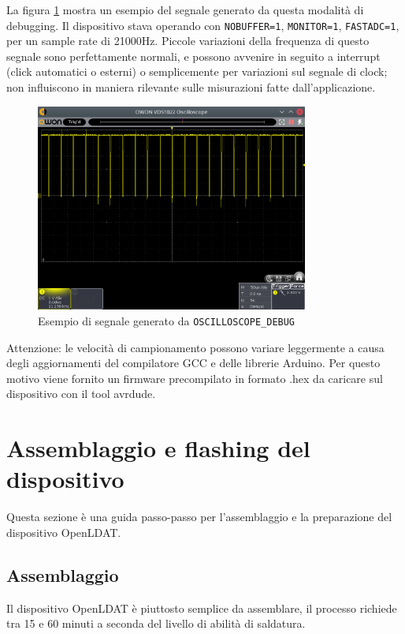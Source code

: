 La figura \ref{fig:oscilloscopedebug} mostra un esempio del segnale generato da questa modalità di debugging. Il dispositivo stava operando con \texttt{NOBUFFER=1}, \texttt{MONITOR=1}, \texttt{FASTADC=1}, per un sample rate di 21000Hz. Piccole variazioni della frequenza di questo segnale sono perfettamente normali, e possono avvenire in seguito a interrupt (click automatici o esterni) o semplicemente per variazioni sul segnale di clock; non influiscono in maniera rilevante sulle misurazioni fatte dall'applicazione.

\begin{figure}[h]
	\centering
	\includegraphics[width=0.8\textwidth]{Dispositivo_files/scope.png}
	\caption{Esempio di segnale generato da \texttt{OSCILLOSCOPE\_DEBUG}}
	\label{fig:oscilloscopedebug}
\end{figure}

Attenzione: le velocità di campionamento possono variare leggermente a causa degli aggiornamenti del compilatore GCC e delle librerie Arduino. Per questo motivo viene fornito un firmware precompilato in formato .hex da caricare sul dispositivo con il tool avrdude.

\section{Assemblaggio e flashing del dispositivo}
Questa sezione è una guida passo-passo per l'assemblaggio e la preparazione del dispositivo OpenLDAT.

\subsection{Assemblaggio}
Il dispositivo OpenLDAT è piuttosto semplice da assemblare, il processo richiede tra 15 e 60 minuti a seconda del livello di abilità di saldatura.

